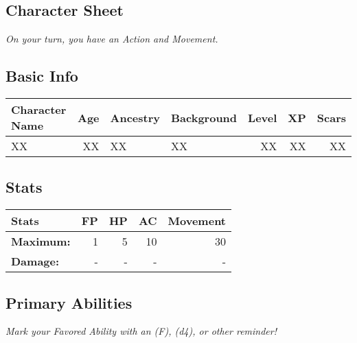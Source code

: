 \documentclass[10pt]{article}
\renewenvironment{longtable}{\begin{center}\begin{tabular}}{\end{tabular}\end{center}}
\renewcommand{\endhead}{}
\renewcommand{\toprule}[2]{\hline}
\renewcommand{\midrule}[2]{\hline}
\renewcommand{\bottomrule}[2]{\hline}
\renewcommand{\endlastfoot}{}
\begin{document}
\begin{multicols}{2}

\section{Character Sheet}\label{character-sheet}

\emph{On your turn, you have an Action and Movement.}

\subsection{Basic Info}\label{basic-info}

\begin{longtable}[]{@{}lrllrrr@{}}
\toprule\noalign{}
Character Name & Age & Ancestry & Background & Level & XP & Scars \\
\midrule\noalign{}
\endhead
\bottomrule\noalign{}
\endlastfoot
XX & XX & XX & XX & XX & XX & XX \\
\end{longtable}

\subsection{Stats}\label{stats}

\begin{longtable}[]{@{}lrrrr@{}}
\toprule\noalign{}
Stats & FP & HP & AC & Movement \\
\midrule\noalign{}
\endhead
\bottomrule\noalign{}
\endlastfoot
\textbf{Maximum:} & 1 & 5 & 10 & 30\textquotesingle{} \\
\textbf{Damage:} & - & - & - & - \\
\end{longtable}

\subsection{Primary Abilities}\label{primary-abilities}

\emph{Mark your Favored Ability with an (F), (d4), or other reminder!}


\end{multicols}
\end{document}
